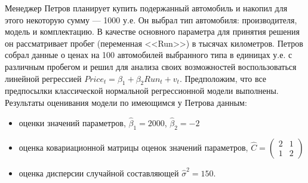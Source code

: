 \documentclass[addpoints, answers]{exam} %
\begin{document}
\begin{questions}
\begin{parts}
\begin{solution}
\end{solution}

\end{parts}

\question Менеджер Петров планирует купить подержанный автомобиль и накопил для этого некоторую сумму --- 1000 у.е. Он выбрал тип автомобиля: производителя, модель и комплектацию. В качестве основного параметра для принятия решения он рассматривает пробег (переменная <<Run>>) в тысячах километров. Петров собрал данные о ценах на 100 автомобилей выбранного типа в единицах у.е. с различным пробегом и решил для анализа своих возможностей воспользоваться линейной регрессией $Price_t=\beta_1+\beta_2 Run_t+v_t$. Предположим, что все предпосылки классической нормальной регрессионной модели выполнены. Результаты оценивания модели по имеющимся у Петрова данным: 
\begin{itemize}
\item оценки значений параметров, $\hat{\beta}_1=2000$, $\hat{\beta}_2=-2$
\item оценка ковариационной матрицы оценок значений параметров, $\hat{C}=
\begin{pmatrix}
2 & 1 \\
1 & 2 
\end{pmatrix}$
\item оценка дисперсии случайной составляющей $\hat{\sigma}^2=150$.
\end{itemize}

\end{questions}
\end{document}
